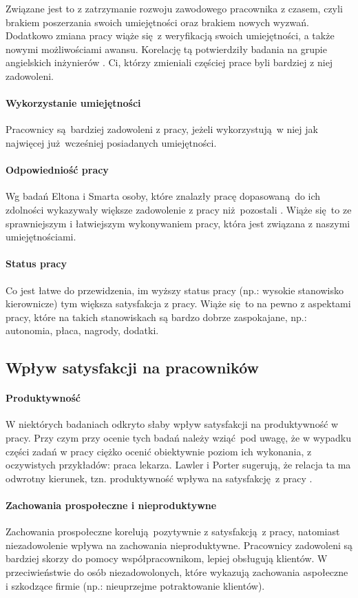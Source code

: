 Związane jest to z zatrzymanie rozwoju zawodowego pracownika z czasem, czyli brakiem poszerzania swoich umiejętności oraz brakiem nowych wyzwań. Dodatkowo zmiana pracy wiąże się z weryfikacją swoich umiejętności, a także nowymi możliwościami awansu. Korelację tą potwierdziły badania na grupie angielskich inżynierów \cite{newton1991further}. Ci, którzy zmieniali częściej prace byli bardziej z niej zadowoleni.
\paragraph{Wykorzystanie umiejętności} Pracownicy są bardziej zadowoleni z pracy, jeżeli wykorzystują w niej jak najwięcej już wcześniej posiadanych umiejętności.
\paragraph{Odpowiedniość pracy} Wg badań Eltona i Smarta osoby, które znalazły pracę dopasowaną do ich zdolności wykazywały większe zadowolenie z pracy niż pozostali \cite{elton1988extrinsic}. Wiąże się to ze sprawniejszym i łatwiejszym wykonywaniem pracy, która jest związana z naszymi umiejętnościami.
\paragraph{Status pracy} Co jest łatwe do przewidzenia, im wyższy status pracy (np.: wysokie stanowisko kierownicze) tym większa satysfakcja z pracy. Wiąże się to na pewno z aspektami pracy, które na takich stanowiskach są bardzo dobrze zaspokajane, np.: autonomia, płaca, nagrody, dodatki.

\subsection{Wpływ satysfakcji na pracowników}
\label{sec:theory-sat-infl}
\paragraph{Produktywność} W niektórych badaniach odkryto słaby wpływ satysfakcji na produktywność w pracy. Przy czym przy ocenie tych badań należy wziąć pod uwagę, że w wypadku części zadań w pracy ciężko ocenić obiektywnie poziom ich wykonania, z oczywistych przykładów: praca lekarza. Lawler i Porter sugerują, że relacja ta ma odwrotny kierunek, tzn. produktywność wpływa na satysfakcję z pracy \cite{lawler1967effect}.
\paragraph{Zachowania prospołeczne i nieproduktywne} Zachowania prospołeczne korelują pozytywnie z satysfakcją z pracy, natomiast niezadowolenie wpływa na zachowania nieproduktywne. Pracownicy zadowoleni są bardziej skorzy do pomocy współpracownikom, lepiej obsługują klientów. W przeciwieństwie do osób niezadowolonych, które wykazują zachowania aspołeczne i szkodzące firmie (np.: nieuprzejme potraktowanie klientów).
